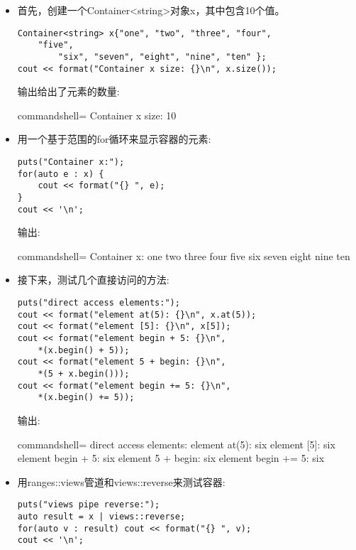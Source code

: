 \begin{itemize}
\item 
首先，创建一个Container<string>对象x，其中包含10个值。

\begin{lstlisting}[style=styleCXX]
Container<string> x{"one", "two", "three", "four",
	"five",
		"six", "seven", "eight", "nine", "ten" };
cout << format("Container x size: {}\n", x.size());
\end{lstlisting}

输出给出了元素的数量:

\begin{tcblisting}{commandshell={}}
Container x size: 10
\end{tcblisting}

\item 
用一个基于范围的for循环来显示容器的元素:

\begin{lstlisting}[style=styleCXX]
puts("Container x:");
for(auto e : x) {
	cout << format("{} ", e);
}
cout << '\n';
\end{lstlisting}

输出:

\begin{tcblisting}{commandshell={}}
Container x:
one two three four five six seven eight nine ten
\end{tcblisting}

\item 
接下来，测试几个直接访问的方法:

\begin{lstlisting}[style=styleCXX]
puts("direct access elements:");
cout << format("element at(5): {}\n", x.at(5));
cout << format("element [5]: {}\n", x[5]);
cout << format("element begin + 5: {}\n",
	*(x.begin() + 5));
cout << format("element 5 + begin: {}\n",
	*(5 + x.begin()));
cout << format("element begin += 5: {}\n",
	*(x.begin() += 5));
\end{lstlisting}

输出:

\begin{tcblisting}{commandshell={}}
direct access elements:
element at(5): six
element [5]: six
element begin + 5: six
element 5 + begin: six
element begin += 5: six
\end{tcblisting}

\item 
用ranges::views管道和views::reverse来测试容器:

\begin{lstlisting}[style=styleCXX]
puts("views pipe reverse:");
auto result = x | views::reverse;
for(auto v : result) cout << format("{} ", v);
cout << '\n';
\end{lstlisting}


\end{itemize}
